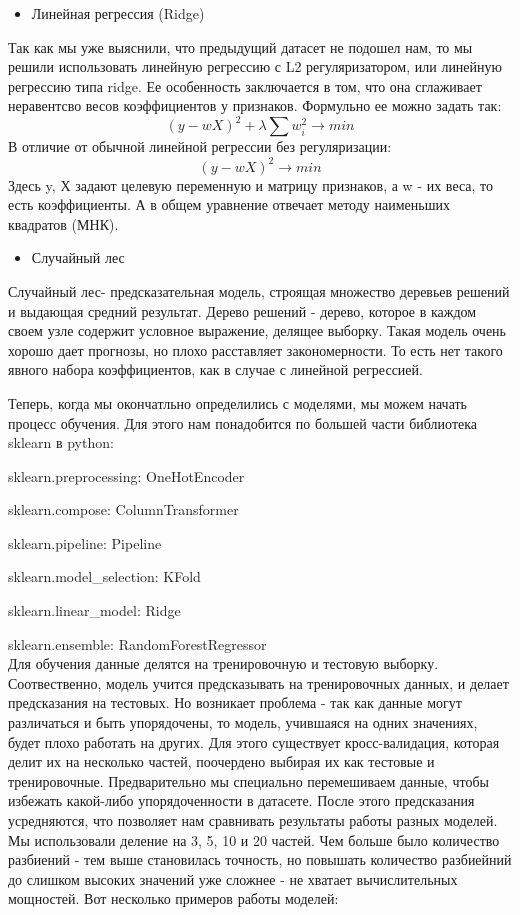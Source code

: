 \documentclass{article}
\begin{document}
\begin{itemize}
   \color{red} \item \color{black} Линейная регрессия (Ridge)
\end{itemize}

Так как мы уже выяснили, что предыдущий датасет не подошел нам, то мы решили использовать линейную регрессию с L2 регуляризатором, или линейную регрессию типа ridge\cite{WEBSITE:5}. Ее особенность заключается в том, что она сглаживает неравентсво весов коэффициентов у признаков. Формульно ее можно задать так:
\[(y - wX)^2 + \lambda \sum {}{}w_i ^ 2 \rightarrow min \]
В отличие от обычной линейной регрессии без регуляризации:
\[(y - wX)^2  \rightarrow min \]
Здесь y, Х задают целевую переменную и матрицу признаков, а w - их веса, то есть коэффициенты. А в общем уравнение отвечает методу наименьших квадратов (МНК).

\begin{itemize}
   \color{red} \item \color{black} Случайный лес 
\end{itemize}
Случайный лес\cite{WEBSITE:6}- предсказательная модель, строящая множество деревьев решений и выдающая средний результат. Дерево решений - дерево, которое в каждом своем узле содержит условное выражение, делящее выборку. Такая модель очень хорошо дает прогнозы, но плохо расставляет закономерности. То есть нет такого явного набора коэффициентов, как в случае с линейной регрессией. 

Теперь, когда мы окончатльно определились с моделями, мы можем начать процесс обучения. 
Для этого нам понадобится по большей части библиотека sklearn в python:

sklearn.preprocessing: OneHotEncoder

sklearn.compose: ColumnTransformer


sklearn.pipeline: Pipeline


sklearn.model\_selection: KFold

sklearn.linear\_model: Ridge


sklearn.ensemble: RandomForestRegressor\\

Для обучения данные делятся на тренировочную и тестовую выборку. Соотвественно, модель учится предсказывать на тренировочных данных, и делает предсказания на тестовых. Но возникает проблема - так как данные могут различаться и быть упорядочены, то модель, учившаяся на одних значениях, будет плохо работать на других. Для этого существует кросс-валидация, которая  делит их на несколько частей, поочердено выбирая их как тестовые и тренировочные. Предварительно мы специально перемешиваем данные, чтобы избежать какой-либо упорядоченности в датасете. После этого предсказания усредняются, что позволяет нам сравнивать результаты работы разных моделей. 
Мы использовали деление на 3, 5, 10 и 20 частей. Чем больше было количество разбиений - тем выше становилась точность, но повышать количество разбиейний до слишком высоких значений уже сложнее - не хватает вычислительных мощностей. Вот несколько примеров работы моделей:\\
\end{document}
